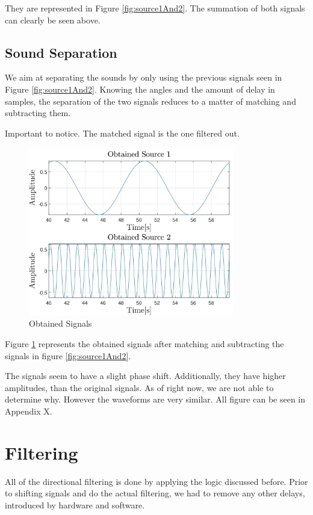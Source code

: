 They are represented in Figure \ref{fig:source1And2}. The summation of both signals can clearly 
be seen above.
\newpage
\subsection*{Sound Separation}
We aim at separating the sounds by only using the previous signals seen in Figure \ref{fig:source1And2}.
Knowing the angles and the amount of delay in samples, the separation of the two signals reduces to
a matter of matching and subtracting them. 

Important to notice. The matched signal is the one filtered out.
\begin{figure}[htp]
	\centering
	\includegraphics[width=0.8\textwidth]{Illustrations/obtainedSource1And2.jpg}
	\caption{Obtained Signals}
	\label{fig:obtainedSignals}
\end{figure}

Figure \ref{fig:obtainedSignals} represents the obtained signals after matching and subtracting the signals
in figure \ref{fig:source1And2}.

The signals seem to have a slight phase shift. Additionally, they have higher amplitudes, than the original
signals. As of right now, we are not able to determine why. However the waveforms are very similar.
All figure can be seen in Appendix X.
\newpage
\section{Filtering}
All of the directional filtering is done by applying the logic discussed before. Prior to shifting signals 
and do the actual filtering, we had to remove any other delays, introduced by hardware and software.

